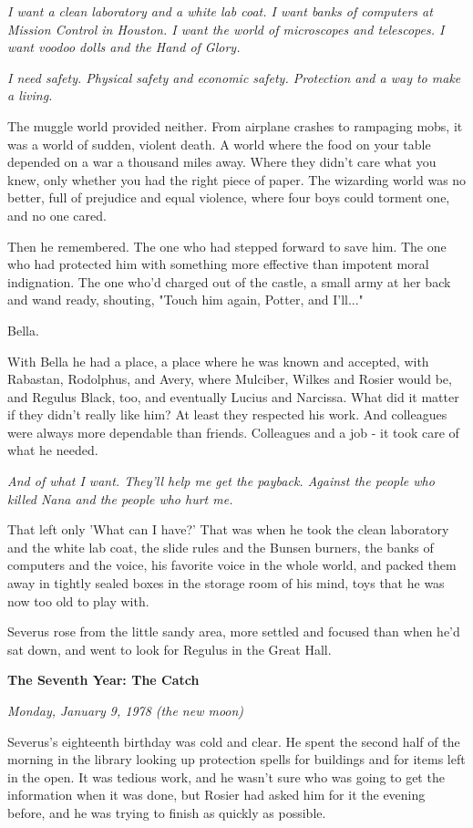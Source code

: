 \documentclass[a4paper,11pt]{article}
\begin{document}
\emph{I want a clean laboratory and a white lab coat. I want banks of computers at Mission Control in Houston. I want the world of microscopes and telescopes. I want voodoo dolls and the Hand of Glory.}

\emph{I need safety. Physical safety and economic safety. Protection and a way to make a living.}

The muggle world provided neither. From airplane crashes to rampaging mobs, it was a world of sudden, violent death. A world where the food on your table depended on a war a thousand miles away. Where they didn't care what you knew, only whether you had the right piece of paper. The wizarding world was no better, full of prejudice and equal violence, where four boys could torment one, and no one cared.

Then he remembered. The one who had stepped forward to save him. The one who had protected him with something more effective than impotent moral indignation. The one who'd charged out of the castle, a small army at her back and wand ready, shouting, "Touch him again, Potter, and I'll..."

Bella.

With Bella he had a place, a place where he was known and accepted, with Rabastan, Rodolphus, and Avery, where Mulciber, Wilkes and Rosier would be, and Regulus Black, too, and eventually Lucius and Narcissa. What did it matter if they didn't really like him? At least they respected his work. And colleagues were always more dependable than friends. Colleagues and a job - it took care of what he needed.

\emph{And of what I want. They'll help me get the payback. Against the people who killed Nana and the people who hurt me.}

That left only 'What can I have?' That was when he took the clean laboratory and the white lab coat, the slide rules and the Bunsen burners, the banks of computers and the voice, his favorite voice in the whole world, and packed them away in tightly sealed boxes in the storage room of his mind, toys that he was now too old to play with.

Severus rose from the little sandy area, more settled and focused than when he'd sat down, and went to look for Regulus in the Great Hall.

\textbf{The Seventh Year: The Catch}

\emph{Monday, January 9, 1978 (the new moon)}

Severus's eighteenth birthday was cold and clear. He spent the second half of the morning in the library looking up protection spells for buildings and for items left in the open. It was tedious work, and he wasn't sure who was going to get the information when it was done, but Rosier had asked him for it the evening before, and he was trying to finish as quickly as possible.
\end{document}
